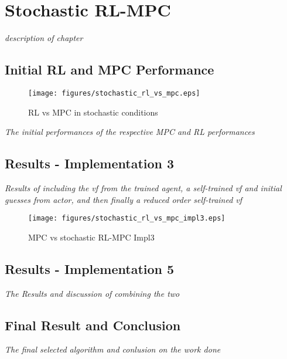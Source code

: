 \chapter{Stochastic RL-MPC}
\label{chapter:stochastic_RL_MPC}

\emph{description of chapter}

\section{Initial RL and MPC Performance}

\begin{figure}[H]
	\centering
	\texttt{[image: figures/stochastic\_rl\_vs\_mpc.eps]}
	\caption{RL vs MPC in stochastic conditions}
	\label{fig:stochastic-rl-vs-mpc}
\end{figure}

\emph{The initial performances of the respective MPC and RL performances}

\section{Results - Implementation 3}
\emph{Results of including the vf from the trained agent, a self-trained vf and initial guesses from actor, and then finally a reduced order self-trained vf}

\begin{figure}[H]
	\centering
	\texttt{[image: figures/stochastic\_rl\_vs\_mpc\_impl3.eps]}
	\caption{MPC vs stochastic RL-MPC Impl3}
	\label{fig:stochastic-rlmpc-impl3}
\end{figure}



\section{Results - Implementation 5}
\emph{The Results and discussion of combining the two}


\section{Final Result and Conclusion}
\emph{The final selected algorithm and conlusion on the work done}